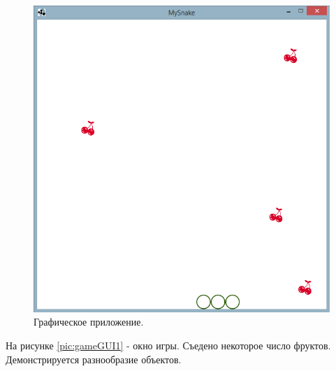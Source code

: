\documentclass[a4paper]{article}
\begin{document}
\begin{figure}[H]
	\begin{center}
		\includegraphics[scale=0.5]{mainGUI}
		\caption{Графическое приложение.} 
		\label{pic:mainGUI} %
	\end{center}
\end{figure}

На рисунке \ref{pic:gameGUI1} - окно игры. Съедено некоторое число фруктов. Демонстрируется разнообразие объектов.
\end{document}
